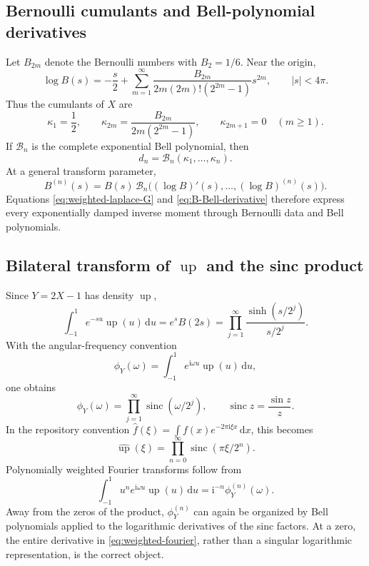 \documentclass[11pt,oneside]{article}
\theoremstyle{definition}
\theoremstyle{remark}
\newcommand{\ii}{\mathrm i}
\newcommand{\dd}{\,\mathrm d}
\newcommand{\upf}{\operatorname{up}}
\newcommand{\sinc}{\operatorname{sinc}}
\begin{document}
\subsection{Bernoulli cumulants and Bell-polynomial derivatives}

Let $B_{2m}$ denote the Bernoulli numbers with $B_2=1/6$.  Near the origin,
\begin{equation}\label{eq:log-B-Bernoulli}
 \log B(s)=-\frac{s}{2}
 +\sum_{m=1}^{\infty}
 \frac{B_{2m}}{2m(2m)!(2^{2m}-1)}s^{2m},
 \qquad |s|<4\pi.
\end{equation}
Thus the cumulants of $X$ are
\begin{equation}\label{eq:cumulants-X}
 \kappa_1=\frac12,
 \qquad
 \kappa_{2m}=\frac{B_{2m}}{2m(2^{2m}-1)},
 \qquad
 \kappa_{2m+1}=0\quad(m\ge1).
\end{equation}
If $\mathcal B_n$ is the complete exponential Bell polynomial, then
\begin{equation}\label{eq:moments-Bell}
 d_n=\mathcal B_n(\kappa_1,\ldots,\kappa_n).
\end{equation}
At a general transform parameter,
\begin{equation}\label{eq:B-Bell-derivative}
 B^{(n)}(s)=B(s)\,
 \mathcal B_n\bigl((\log B)'(s),\ldots,(\log B)^{(n)}(s)\bigr).
\end{equation}
Equations \eqref{eq:weighted-laplace-G} and \eqref{eq:B-Bell-derivative} therefore express every exponentially damped inverse moment through Bernoulli data and Bell polynomials.

\subsection{Bilateral transform of $\upf$ and the sinc product}

Since $Y=2X-1$ has density $\upf$,
\begin{equation}\label{eq:bilateral-up-laplace}
 \int_{-1}^{1}e^{-su}\upf(u)\dd u
 =e^sB(2s)
 =\prod_{j=1}^{\infty}
 \frac{\sinh(s/2^j)}{s/2^j}.
\end{equation}
With the angular-frequency convention
\[
 \phi_Y(\omega)=\int_{-1}^{1}e^{\ii\omega u}\upf(u)\dd u,
\]
one obtains
\begin{equation}\label{eq:angular-sinc-product}
 \phi_Y(\omega)=\prod_{j=1}^{\infty}
 \sinc(\omega/2^j),
 \qquad \sinc z=\frac{\sin z}{z}.
\end{equation}
In the repository convention
$\widehat f(\xi)=\int f(x)e^{-2\pi\ii\xi x}\dd x$,
this becomes
\begin{equation}
 \widehat{\upf}(\xi)=
 \prod_{n=0}^{\infty}\sinc(\pi\xi/2^n).
\end{equation}
Polynomially weighted Fourier transforms follow from
\begin{equation}\label{eq:weighted-fourier}
 \int_{-1}^{1}u^ne^{\ii\omega u}\upf(u)\dd u
 =\ii^{-n}\phi_Y^{(n)}(\omega).
\end{equation}
Away from the zeros of the product, $\phi_Y^{(n)}$ can again be organized by Bell polynomials applied to the logarithmic derivatives of the sinc factors.  At a zero, the entire derivative in \eqref{eq:weighted-fourier}, rather than a singular logarithmic representation, is the correct object.
\end{document}
